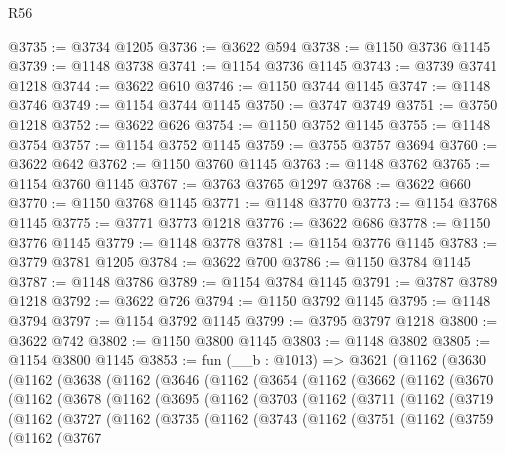 \begin{lexlean}{R56}
\begin{coremodule}
@3735 := @3734 @1205
@3736 := @3622 @594
@3738 := @1150 @3736 @1145
@3739 := @1148 @3738
@3741 := @1154 @3736 @1145
@3743 := @3739 @3741 @1218
@3744 := @3622 @610
@3746 := @1150 @3744 @1145
@3747 := @1148 @3746
@3749 := @1154 @3744 @1145
@3750 := @3747 @3749
@3751 := @3750 @1218
@3752 := @3622 @626
@3754 := @1150 @3752 @1145
@3755 := @1148 @3754
@3757 := @1154 @3752 @1145
@3759 := @3755 @3757 @3694
@3760 := @3622 @642
@3762 := @1150 @3760 @1145
@3763 := @1148 @3762
@3765 := @1154 @3760 @1145
@3767 := @3763 @3765 @1297
@3768 := @3622 @660
@3770 := @1150 @3768 @1145
@3771 := @1148 @3770
@3773 := @1154 @3768 @1145
@3775 := @3771 @3773 @1218
@3776 := @3622 @686
@3778 := @1150 @3776 @1145
@3779 := @1148 @3778
@3781 := @1154 @3776 @1145
@3783 := @3779 @3781 @1205
@3784 := @3622 @700
@3786 := @1150 @3784 @1145
@3787 := @1148 @3786
@3789 := @1154 @3784 @1145
@3791 := @3787 @3789 @1218
@3792 := @3622 @726
@3794 := @1150 @3792 @1145
@3795 := @1148 @3794
@3797 := @1154 @3792 @1145
@3799 := @3795 @3797 @1218
@3800 := @3622 @742
@3802 := @1150 @3800 @1145
@3803 := @1148 @3802
@3805 := @1154 @3800 @1145
@3853 := fun (__b : @1013) =>
  @3621
    (@1162
      (@3630
        (@1162
          (@3638
            (@1162
              (@3646
                (@1162
                  (@3654
                    (@1162
                      (@3662
                        (@1162
                          (@3670
                            (@1162
                              (@3678
                                (@1162
                                  (@3695
                                    (@1162
                                      (@3703
                                        (@1162
                                          (@3711
                                            (@1162
                                              (@3719
                                                (@1162
                                                  (@3727
                                                    (@1162
                                                      (@3735
                                                        (@1162
                                                          (@3743
                                                            (@1162
                                                              (@3751
                                                                (@1162
                                                                  (@3759
                                                                    (@1162
                                                                      (@3767

\end{coremodule}
\end{lexlean}
